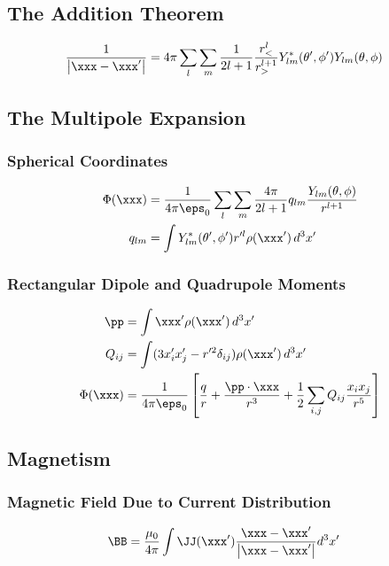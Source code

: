 \documentclass[11pt]{article}
\begin{document}
\subsection{The Addition Theorem}
\label{sec:org39603fb}
\begin{align*}
\frac{1}{\left| \xxx - \xxx' \right|} & = 4\pi \sum_l \sum_m \frac{1}{2l+1} \frac{r_<^l}{r_>^{l+1}} Y_{lm}^*(\theta', \phi') Y_{lm}(\theta, \phi)
\end{align*}
\subsection{The Multipole Expansion}
\label{sec:orgaa46004}
\subsubsection{Spherical Coordinates}
\label{sec:orgfe40b80}
\begin{align*}
\Phi(\xxx) & = \frac{1}{4\pi \eps_0} \sum_l \sum_m \frac{4\pi}{2l+1} q_{lm} \frac{Y_{lm}(\theta, \phi)}{r^{l+1}} \\
q_{lm} & = \int Y_{lm}^*(\theta', \phi') r^{\prime l} \rho(\xxx') \, d^3 x'
\end{align*}
\subsubsection{Rectangular Dipole and Quadrupole Moments}
\label{sec:orgfe7bac7}
\begin{align*}
\pp & = \int \xxx' \rho(\xxx') \, d^3 x' \\
Q_{ij} & = \int (3x_i' x_j' - r^{\prime 2} \delta_{ij}) \rho(\xxx') \, d^3 x' \\
\Phi(\xxx) & = \frac{1}{4\pi \eps_0} \left[ \frac{q}{r} + \frac{\pp \cdot \xxx}{r^3}
+ \frac{1}{2} \sum_{i,j} Q_{ij} \frac{x_i x_j}{r^5} \right]
\end{align*}
\subsection{Magnetism}
\label{sec:org6f31709}
\subsubsection{Magnetic Field Due to Current Distribution}
\label{sec:orgb03838f}
\begin{align*}
\BB & = \frac{\mu_0}{4\pi} \int \JJ(\xxx') \frac{\xxx - \xxx'}{\left| \xxx - \xxx' \right|} d^3 x'
\end{align*}
\end{document}

